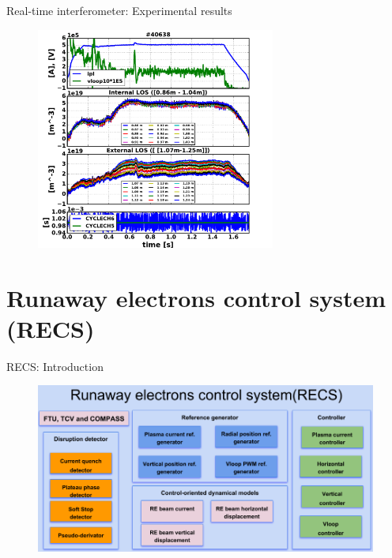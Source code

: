 \documentclass{beamer}
\begin{document}
\begin{frame}{Real-time interferometer: Experimental results}
    \begin{figure}
        \centering
        \includegraphics[width=0.7\textwidth]{inter/inter_40638.pdf}
    \end{figure}
    
    
\end{frame}





\section{Runaway electrons control system (RECS)}

\begin{frame}{RECS: Introduction}

\begin{figure}[h]
	\centering
	\includegraphics[width=1\linewidth]{Chapter3Fig/RESCframework.png}
\end{figure}
\end{frame}
\end{document}
